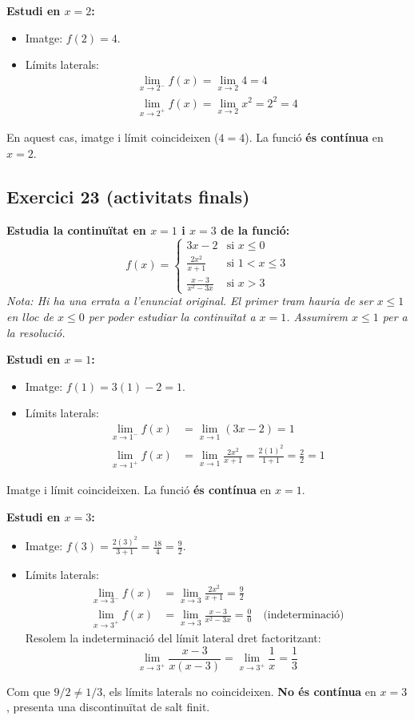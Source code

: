 \documentclass[12pt,a4paper]{article}
\begin{document}
\textbf{Estudi en $x=2$:}
\begin{itemize}
    \item Imatge: $f(2) = 4$.
    \item Límits laterals:
    \begin{align*}
        \lim_{x \to 2^-} f(x) = \lim_{x \to 2} 4 = 4 \\
        \lim_{x \to 2^+} f(x) = \lim_{x \to 2} x^2 = 2^2 = 4
    \end{align*}
\end{itemize}
En aquest cas, imatge i límit coincideixen ($4 = 4$). La funció \textbf{és contínua} en $x=2$.

\vspace{0.5cm}

\subsection{Exercici 23 (activitats finals)}

\textbf{Estudia la continuïtat en $x=1$ i $x=3$ de la funció:}
\[ f(x) = \begin{cases} 3x-2 & \text{si } x \le 0 \\ \frac{2x^2}{x+1} & \text{si } 1 < x \le 3 \\ \frac{x-3}{x^2-3x} & \text{si } x > 3 \end{cases} \]
\textit{Nota: Hi ha una errata a l'enunciat original. El primer tram hauria de ser $x \le 1$ en lloc de $x \le 0$ per poder estudiar la continuïtat a $x=1$. Assumirem $x \le 1$ per a la resolució.}

\textbf{Estudi en $x=1$:}
\begin{itemize}
    \item Imatge: $f(1) = 3(1)-2 = 1$.
    \item Límits laterals:
    \begin{align*}
        \lim_{x \to 1^-} f(x) &= \lim_{x \to 1} (3x-2) = 1 \\
        \lim_{x \to 1^+} f(x) &= \lim_{x \to 1} \frac{2x^2}{x+1} = \frac{2(1)^2}{1+1} = \frac{2}{2} = 1
    \end{align*}
\end{itemize}
Imatge i límit coincideixen. La funció \textbf{és contínua} en $x=1$.

\textbf{Estudi en $x=3$:}
\begin{itemize}
    \item Imatge: $f(3) = \frac{2(3)^2}{3+1} = \frac{18}{4} = \frac{9}{2}$.
    \item Límits laterals:
    \begin{align*}
        \lim_{x \to 3^-} f(x) &= \lim_{x \to 3} \frac{2x^2}{x+1} = \frac{9}{2} \\
        \lim_{x \to 3^+} f(x) &= \lim_{x \to 3} \frac{x-3}{x^2-3x} = \frac{0}{0} \quad \text{(indeterminació)}
    \end{align*}
    Resolem la indeterminació del límit lateral dret factoritzant:
    \[ \lim_{x \to 3^+} \frac{x-3}{x(x-3)} = \lim_{x \to 3^+} \frac{1}{x} = \frac{1}{3} \]
\end{itemize}
Com que $9/2 \neq 1/3$, els límits laterals no coincideixen. \textbf{No és contínua} en $x=3$, presenta una discontinuïtat de salt finit.
\end{document}
